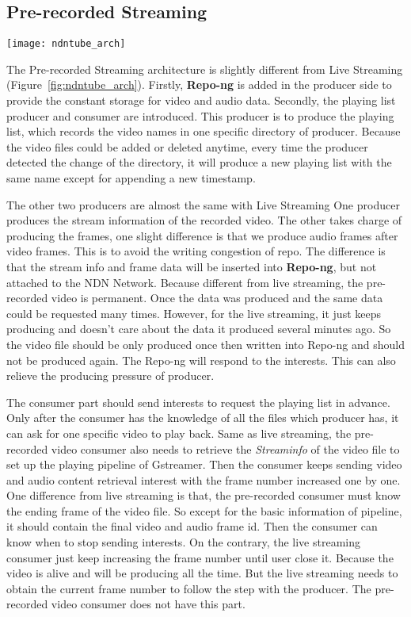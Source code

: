 \subsection{Pre-recorded Streaming}
\begin{figure*}[htbp]
  \centering
  \texttt{[image: ndntube\_arch]}
  \caption{NDNTube Architecture}
  \label{fig:ndntube_arch}
\end{figure*}

The Pre-recorded Streaming architecture is slightly different from Live Streaming (Figure~\ref{fig:ndntube_arch}). Firstly, \textbf{Repo-ng} is added in the producer side to provide the constant storage for video and audio data. Secondly, the playing list producer and consumer are introduced. This producer is to produce the playing list, which records the video names in one specific directory of producer. Because the video files could be added or deleted anytime, every time the producer detected the change of the directory, it will produce a new playing list with the same name except for appending a new timestamp.

The other two producers are almost the same with Live Streaming  One producer produces the stream information of the recorded video. The other takes charge of producing the frames, one slight difference is that we produce audio frames after video frames. This is to avoid the writing congestion of repo. The difference is that the stream info and frame data will be inserted into \textbf{Repo-ng}, but not attached to the NDN Network. Because different from live streaming, the pre-recorded video is permanent. Once the data was produced and the same data could be requested many times. However, for the live streaming, it just keeps producing and doesn't care about the data it produced several minutes ago. So the video file should be only produced once then written into Repo-ng and should not be produced again. The Repo-ng will respond to the interests. This can also relieve the producing pressure of producer.  

The consumer part should send interests to request the playing list in advance. Only after the consumer has the knowledge of all the files which producer has, it can ask for one specific video to play back. Same as live streaming, the pre-recorded video consumer also needs to retrieve the \textit{Streaminfo} of the video file to set up the playing pipeline of Gstreamer. Then the consumer keeps sending video and audio content retrieval interest with the frame number increased one by one. One difference from live streaming is that, the pre-recorded consumer must know the ending frame of the video file. So except for the basic information of pipeline, it should contain the final video and audio frame id. Then the consumer can know when to stop sending interests. On the contrary, the live streaming consumer just keep increasing the frame number until user close it. Because the video is alive and will be producing all the time. But the live streaming needs to obtain the current frame number to follow the step with the producer. The pre-recorded video consumer does not have this part.

